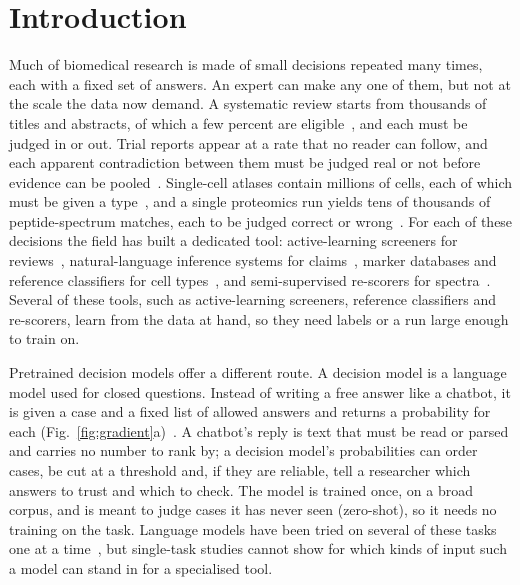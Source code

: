\documentclass[10pt,twocolumn]{article}
\begin{document}
\section{Introduction}

Much of biomedical research is made of small decisions repeated many times, each with a fixed set of answers. An expert can make any one of them, but not at the scale the data now demand. A systematic review starts from thousands of titles and abstracts, of which a few percent are eligible~\cite{borah2017}, and each must be judged in or out. Trial reports appear at a rate that no reader can follow, and each apparent contradiction between them must be judged real or not before evidence can be pooled~\cite{bastian2010,ioannidis2005}. Single-cell atlases contain millions of cells, each of which must be given a type~\cite{tabula}, and a single proteomics run yields tens of thousands of peptide-spectrum matches, each to be judged correct or wrong~\cite{elias}. For each of these decisions the field has built a dedicated tool: active-learning screeners for reviews~\cite{asreview}, natural-language inference systems for claims~\cite{lan2026}, marker databases and reference classifiers for cell types~\cite{cellmarker,abdelaal}, and semi-supervised re-scorers for spectra~\cite{kall,mokapot}. Several of these tools, such as active-learning screeners, reference classifiers and re-scorers, learn from the data at hand, so they need labels or a run large enough to train on.

Pretrained decision models offer a different route. A decision model is a language model used for closed questions. Instead of writing a free answer like a chatbot, it is given a case and a fixed list of allowed answers and returns a probability for each (Fig.~\ref{fig:gradient}a)~\cite{jev,d3ultra}. A chatbot's reply is text that must be read or parsed and carries no number to rank by; a decision model's probabilities can order cases, be cut at a threshold and, if they are reliable, tell a researcher which answers to trust and which to check. The model is trained once, on a broad corpus, and is meant to judge cases it has never seen (zero-shot), so it needs no training on the task. Language models have been tried on several of these tasks one at a time~\cite{gptcelltype,guo2024,tabllm}, but single-task studies cannot show for which kinds of input such a model can stand in for a specialised tool.
\end{document}
